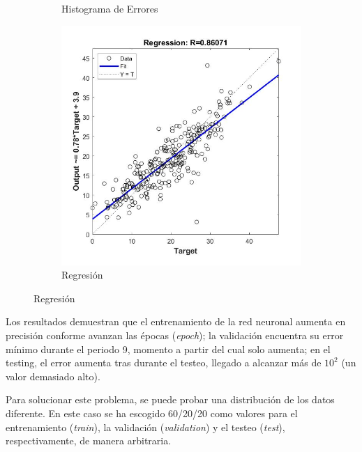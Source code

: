 \documentclass{article}
\begin{document}
\begin{figure}[H]
\begin{subfigure}{0.4\textwidth}
  \caption{Histograma de Errores}
 \end{subfigure}
 \begin{subfigure}{0.4\textwidth}
  \includegraphics[width=0.8\linewidth]{../images/I_ex3_regression_bodyfat_dataset.jpg}
  \caption{Regresión}
 \end{subfigure}
\end{figure}

Los resultados demuestran que el entrenamiento de la red neuronal aumenta en
precisión conforme avanzan las épocas (\textit{epoch}); la validación encuentra
su error mínimo durante el periodo 9, momento a partir del cual solo aumenta; en
el testing, el error aumenta tras durante el testeo, llegado a alcanzar más de 
$10^2$ (un valor demasiado alto).

Para solucionar este problema, se puede probar una distribución de los datos
diferente. En este caso se ha escogido 60/20/20 como valores para el
entrenamiento (\textit{train}), la validación (\textit{validation}) y el testeo
(\textit{test}), respectivamente, de manera arbitraria.
\end{document}
